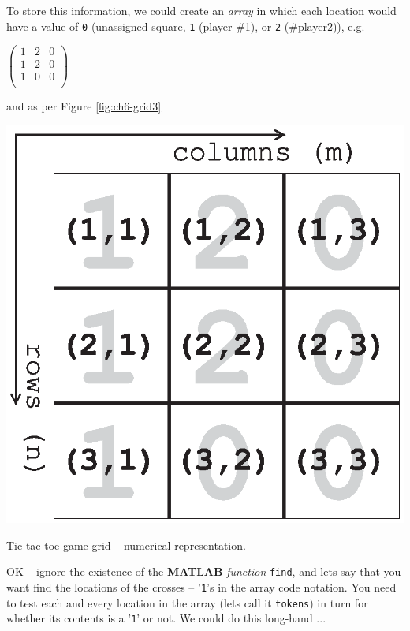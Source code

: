 \documentclass{tufte-book} %
\begin{document}
To store this information, we could create an \textit{array} in which each location would have a value of \texttt{0} (unassigned square, \texttt{1} (player \#1), or \texttt{2} (\#player2)), e.g.

\vspace{2mm}
\(\begin{pmatrix}1 & 2 & 0 \\
1 & 2 & 0 \\
1 & 0 & 0 \\
\end{pmatrix}\)
\vspace{2mm}

\noindent and as per Figure \ref{fig:ch6-grid3}

\begin{marginfigure}[0.0in]
\includegraphics[width=\linewidth]{ch6-grid3.eps}
\caption{Tic-tac-toe game grid -- numerical representation.}
\label{fig:ch6-grid3}
\end{marginfigure}

OK -- ignore the existence of the \textbf{MATLAB} \textit{function} \texttt{find}, and lets say that you want find the locations of the crosses -- '\texttt{1}'s in the array code notation. You need to test each and every location in the array (lets call it \texttt{tokens}) in turn for whether its contents is a '\texttt{1}' or not. We could do this long-hand ...
\end{document}
